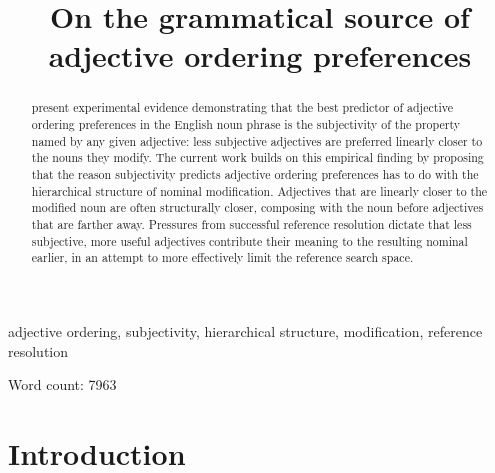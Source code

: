 \documentclass[preprint,authoryear]{elsarticle}\frenchspacing
\begin{document}
\frenchspacing 



\begin{frontmatter}

\title{On the grammatical source of adjective ordering preferences} 











\begin{abstract}
 \cite{scontrasetal2017adjectives} present experimental evidence demonstrating that the best predictor of adjective ordering preferences in the English noun phrase is the subjectivity of the property named by any given adjective: less subjective adjectives are preferred linearly closer to the nouns they modify. The current work builds on this empirical finding by proposing that the reason subjectivity predicts adjective ordering preferences has to do with the hierarchical structure of nominal modification. Adjectives that are linearly closer to the modified noun are often structurally closer, composing with the noun before adjectives that are farther away. Pressures from successful reference resolution dictate that less subjective, more useful adjectives contribute their meaning to the resulting nominal earlier, in an attempt to more effectively limit the reference search space.
\end{abstract}

\begin{keyword}
adjective ordering, subjectivity, hierarchical structure, modification, reference resolution
\end{keyword}

\end{frontmatter}

\noindent Word count: 7963

\section{Introduction}
\end{document}
